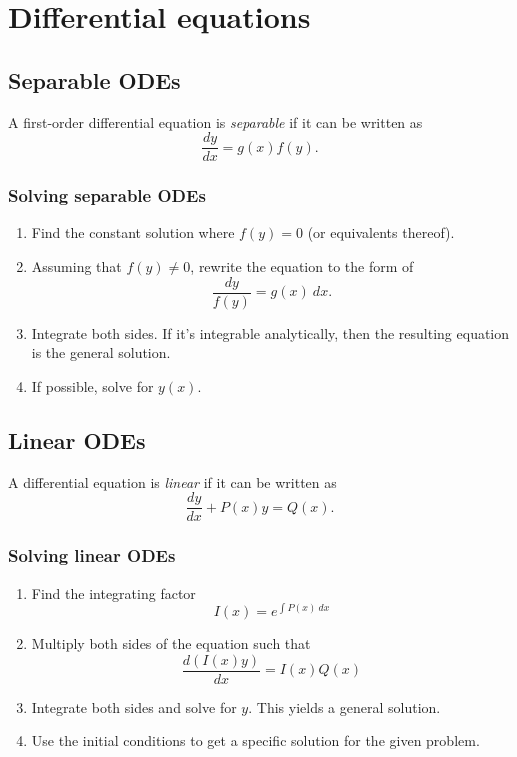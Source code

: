 \documentclass[main.tex]{subfiles}
\begin{document}
\section{Differential equations}
	
	\subsection*{Separable ODEs}
	\begin{definition}[basic]
	A first-order differential equation is \emph{separable} if it can be written as \[\frac{dy}{dx} = g(x)f(y).\]
	\end{definition}
	
	\subsubsection*{Solving separable ODEs}
	\begin{enumerate}
	\item Find the constant solution where \(f(y) = 0\) (or equivalents thereof).
	\item Assuming that \(f(y) \neq 0\), rewrite the equation to the form of \[\frac{dy}{f(y)} = g(x) \ dx.\]
	\item Integrate both sides. If it's integrable analytically, then the resulting equation is the general solution.
	\item If possible, solve for \(y(x)\).
	\end{enumerate}

	\subsection*{Linear ODEs}
	\begin{definition}[basic]
	A differential equation is \emph{linear} if it can be written as \[\frac{dy}{dx} + P(x)y = Q(x).\]
	\end{definition}

	\subsubsection*{Solving linear ODEs}
	\begin{enumerate}
	\item Find the integrating factor \[I(x) = e^{\int P(x) \ dx}\]
	\item Multiply both sides of the equation such that \[\frac{d(I(x) y)}{dx} = I(x)Q(x)\]
	\item Integrate both sides and solve for \(y.\) This yields a general solution.
	\item Use the initial conditions to get a specific solution for the given problem.
	\end{enumerate}
\end{document}
